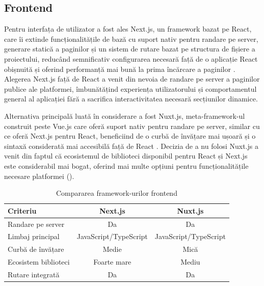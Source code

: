 \subsection{Frontend}
Pentru interfața de utilizator a fost ales Next.js, un framework bazat pe React, care îi extinde funcționalitățile de bază cu suport nativ pentru randare pe server, generare statică a paginilor și un sistem de rutare bazat pe structura de fișiere a proiectului, reducând semnificativ configurarea necesară față de o aplicație React obișnuită și oferind performanță mai bună la prima încărcare a paginilor \cite{nextjs}. Alegerea Next.js față de React a venit din nevoia de randare pe server a paginilor publice ale platformei, îmbunătățind experiența utilizatorului și comportamentul general al aplicației fără a sacrifica interactivitatea necesară secțiunilor dinamice.

Alternativa principală luată în considerare a fost Nuxt.js, meta-framework-ul construit peste Vue.js care oferă suport nativ pentru randare pe server, similar cu ce oferă Next.js pentru React, beneficiind de o curbă de învățare mai ușoară și o sintaxă considerată mai accesibilă față de React \cite{nuxtjs}. Decizia de a nu folosi Nuxt.js a venit din faptul că ecosistemul de biblioteci disponibil pentru React și Next.js este considerabil mai bogat, oferind mai multe opțiuni pentru funcționalitățile necesare platformei ().

\begin{table}[htbp]
    \centering
    \small
    \begin{tabular}{l c c}
        \toprule
        \textbf{Criteriu} & \textbf{Next.js} & \textbf{Nuxt.js} \\
        \midrule
        Randare pe server & Da & Da \\
        Limbaj principal & JavaScript/TypeScript & JavaScript/TypeScript \\
        Curbă de învățare & Medie & Mică \\
        Ecosistem biblioteci & Foarte mare & Mediu \\
        Rutare integrată & Da & Da \\
        \bottomrule
    \end{tabular}
    \caption{Compararea framework-urilor frontend}
    \label{tab:frontend-comparison}
\end{table}

